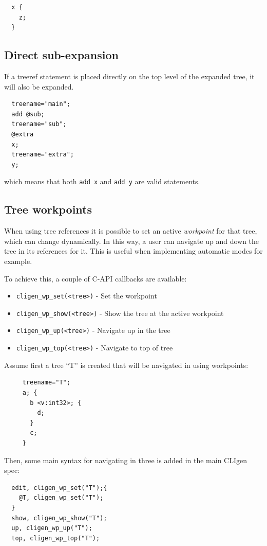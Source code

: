 \documentclass[a4paper, 10pt] {article}
\begin{document}
\begin{verbatim}
  x {
    z;
  }
\end{verbatim}

\subsection{Direct sub-expansion}

If a treeref statement is placed directly on the top level of the
expanded tree, it will also be expanded.
\begin{verbatim}
  treename="main";
  add @sub;
  treename="sub";
  @extra
  x;
  treename="extra";
  y;
\end{verbatim}

which means that both {\tt add x} and {\tt add y} are valid statements.

\subsection{Tree workpoints}

When using tree references it is possible to set an active {\em workpoint}
for that tree, which can change dynamically. In this way,
a user can navigate up and down the tree in its references for it. This
is useful when implementing automatic modes for example.

To achieve this, a couple of C-API callbacks are available:
\begin{itemize}
  \item {\tt cligen\_wp\_set(<tree>)} - Set the workpoint
  \item {\tt cligen\_wp\_show(<tree>)} - Show the tree at the active workpoint
  \item {\tt cligen\_wp\_up(<tree>)} - Navigate up in the tree
  \item {\tt cligen\_wp\_top(<tree>)} - Navigate to top of tree
\end{itemize}

Assume first a tree ``T'' is created that will be navigated in using workpoints:
\begin{verbatim}
     treename="T";
     a; {
       b <v:int32>; {
         d;
       }
       c;
     }
\end{verbatim}

Then, some main syntax for navigating in three is added in the main CLIgen spec:

\begin{verbatim}
  edit, cligen_wp_set("T");{
    @T, cligen_wp_set("T");
  }
  show, cligen_wp_show("T");
  up, cligen_wp_up("T");
  top, cligen_wp_top("T");
\end{verbatim}
\end{document}
